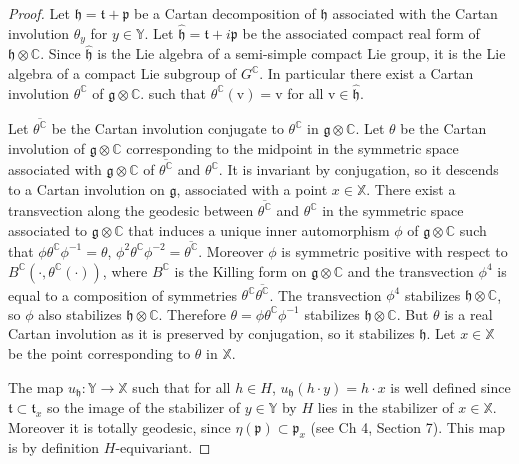 \documentclass[reqno,10pt]{amsart}
\theoremstyle{plain}
\theoremstyle{definition}
\theoremstyle{remark}
\newcommand{\C}{\mathbb{C}}
\newcommand{\X}{\mathbb{X}}
\begin{document}
\begin{proof}
 Let $\mathfrak{h}=\mathfrak{t}+\mathfrak{p}$ be a Cartan decomposition of $\mathfrak{h}$ associated with the Cartan involution $\theta_y$ for $y\in \mathbb{Y}$. Let $\widehat{\mathfrak{h}}=\mathfrak{t}+i\mathfrak{p}$ be the associated compact real form of $\mathfrak{h}\otimes \C$. Since $\widehat{\mathfrak{h}}$ is the Lie algebra of a semi-simple compact Lie group, it is the Lie algebra of a compact Lie subgroup of $G^\C$. In particular there exist a Cartan involution $\theta^\C$ of $\mathfrak{g}\otimes \C$. such that $\theta^\C(\mathrm{v})=\mathrm{v}$ for all $\mathrm{v}\in\widehat{\mathfrak{h}}$.

\medskip 

Let $\overline{\theta^\C}$ be the Cartan involution conjugate to $\theta^\C$ in $\mathfrak{g}\otimes \C$. Let $\theta$ be the Cartan involution of $\mathfrak{g}\otimes \C$ corresponding to the midpoint in the symmetric space associated with $\mathfrak{g}\otimes \C$ of $\overline{\theta^\C}$ and $\theta^\C$. It is invariant by conjugation, so it descends to a Cartan involution on $\mathfrak{g}$, associated with a point $x\in \X$.
There exist a transvection along the geodesic between $\overline{\theta^\C}$ and $\theta^\C$ in the symmetric space associated to $\mathfrak{g}\otimes \C$ that induces a unique inner automorphism $\phi$ of $\mathfrak{g}\otimes \C$ such that $\phi\theta^\C\phi^{-1}=\theta$, $\phi^2\theta^\C\phi^{-2}=\overline{\theta^\C}$. Moreover $\phi$ is symmetric positive with respect to $B^\C\left(\cdot,\theta^\C(\cdot)\right)$, where $B^\C$ is the Killing form on $\mathfrak{g}\otimes \C$ and the transvection $\phi^4$ is equal to a composition of symmetries $\theta^\C\overline{\theta^\C}$. The transvection $\phi^4$ stabilizes $\mathfrak{h}\otimes \C$, so $\phi$ also stabilizes $\mathfrak{h}\otimes \C$. Therefore $\theta=\phi\theta^\C\phi^{-1}$ stabilizes $\mathfrak{h}\otimes\C$. But $\theta$ is a real Cartan involution as it is preserved by conjugation, so it stabilizes $\mathfrak{h}$. Let $x\in \X$ be the point corresponding to $\theta$ in $\X$.

\medskip

The map $u_\mathfrak{h}:\mathbb{Y}\to \X$ such that for all $h\in H$, $u_\mathfrak{h}(h\cdot y)=h\cdot x$ is well defined since $\mathfrak{t}\subset \mathfrak{t}_x$ so the image of the stabilizer of $y\in \mathbb{Y}$ by $H$ lies in the stabilizer of $x\in \mathbb{X}$. Moreover it is totally geodesic, since $\eta(\mathfrak{p})\subset \mathfrak{p}_x$ (see \cite{Helgason} Ch 4, Section 7). This map is by definition $H$-equivariant.


\end{proof}
\end{document}
